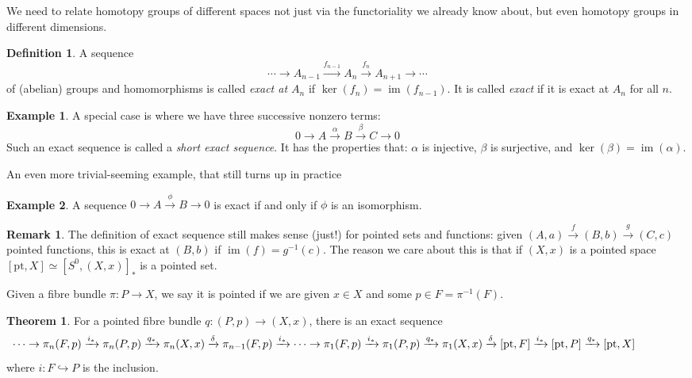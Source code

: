 \documentclass{tufte-handout}
\def\into {\hookrightarrow}
\def\pt {\mathrm{pt}}
\DeclareMathOperator{\im}{im}
\theoremstyle{definition}
\newtheorem{definition}{Definition}
\newtheorem{example}{Example}
\newtheorem{theorem}{Theorem}
\newtheorem*{rem}{Remark}
\begin{document}
We need to relate homotopy groups of different spaces not just via the functoriality we already know about, but even homotopy groups in different dimensions.

\begin{definition}
A sequence
\[
  \cdots \to A_{n-1} \xrightarrow{f_{n-1}} A_n \xrightarrow{f_n} A_{n+1} \to \cdots 
\]
of (abelian) groups and homomorphisms is called \emph{exact at $A_n$} if $\ker(f_n) = \im(f_{n-1})$. It is called \emph{exact} if it is exact at $A_n$ for all $n$.
\end{definition}

\begin{example}
A special case is where we have three successive nonzero terms:
\[
  0\to A \xrightarrow{\alpha} B \xrightarrow{\beta} C \to 0
\]
Such an exact sequence is called a \emph{short exact sequence}. It has the properties that: $\alpha$ is injective, $\beta$ is surjective, and $\ker(\beta) = \im(\alpha)$.
\end{example}

An even more trivial-seeming example, that still turns up in practice

\begin{example}
A sequence $0\to A \xrightarrow{\phi} B \to 0$ is exact if and only if $\phi$ is an isomorphism.
\end{example}

\begin{rem}
The definition of exact sequence still makes sense (just!) for pointed sets and functions: given $(A,a) \xrightarrow{f} (B,b) \xrightarrow{g}  (C,c)$ pointed functions, this is exact at $(B,b)$ if $\im(f) = g^{-1}(c)$. The reason we care about this is that if $(X,x)$ is a pointed space $[\pt,X] \simeq [S^0,(X,x)]_*$ is a pointed set.
\end{rem}

Given a fibre bundle $\pi\colon P\to X$, we say it is pointed if we are given $x\in X$ and some $p\in F = \pi^{-1}(F)$.

\begin{theorem}
For a pointed fibre bundle $q\colon (P,p) \to (X,x)$, there is an exact sequence
\[
\hspace{-1.5cm}\cdots \to \pi_n(F,p) \xrightarrow{i_*} \pi_n(P,p) \xrightarrow{q_*}\pi_n(X,x) \xrightarrow{\delta} \pi_{n-1}(F,p) \xrightarrow{i_*} \cdots \to \pi_1(F,p) \xrightarrow{i_*} \pi_1(P,p) \xrightarrow{q_*} \pi_1(X,x) \xrightarrow{\delta}  [\pt,F] \xrightarrow{i_*} [\pt,P] \xrightarrow{q_*} [\pt,X]
\]
where $i\colon F\into P$ is the inclusion.
\end{theorem}
\end{document}

